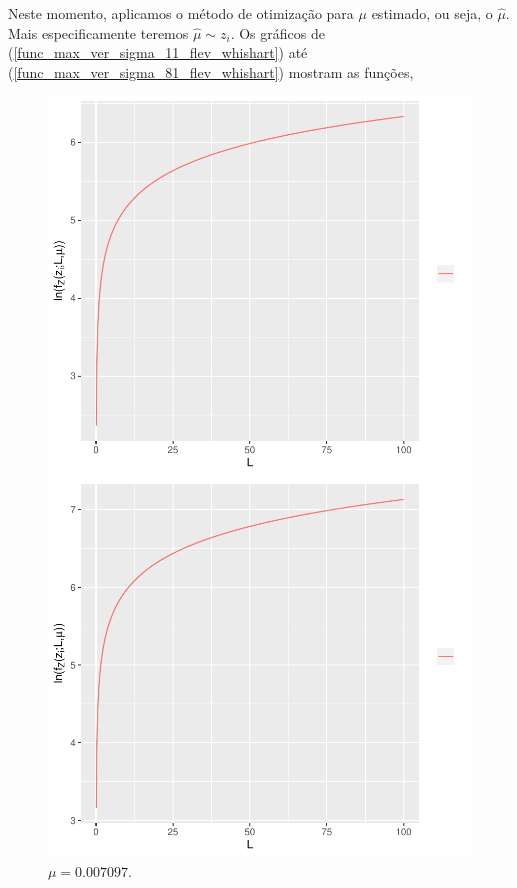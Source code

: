\documentclass[journal,article,submit,moreauthors,pdftex]{Definitions/mdpi}
\begin{document}
Neste momento, aplicamos o método de otimização para $\mu$ estimado, ou seja, o $\hat{\mu}$. Mais especificamente teremos $\hat{\mu}\sim z_i$. Os gráficos de (\ref{func_max_ver_sigma_11_flev_whishart}) até (\ref{func_max_ver_sigma_81_flev_whishart}) mostram as funções, 
\begin{figure}[hbt]
  \includegraphics[width=\linewidth]{func_max_ver_sigma_11_flev_wishart.pdf}
  	\caption{$\mu=0.007097 $.}\label{func_max_ver_l_z_fixo_mu_11_fixo}
\endminipage\hfill
{}
  \includegraphics[width=\linewidth]{func_max_ver_sigma_21_flev_wishart.pdf}

\end{figure}
\end{document}
